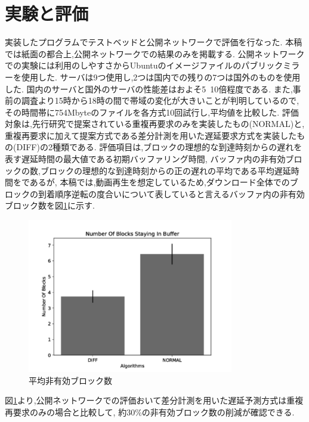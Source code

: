 \documentclass{ltjsarticle}
\begin{document}
\section{実験と評価}
\vspace{-2mm}
実装したプログラムでテストベッドと公開ネットワークで評価を行なった.
本稿では紙面の都合上,公開ネットワークでの結果のみを掲載する.
公開ネットワークでの実験には利用のしやすさからUbuntuのイメージファイルのパブリックミラーを使用した.
サーバは9つ使用し,2つは国内での残りの7つは国外のものを使用した.
国内のサーバと国外のサーバの性能差はおよそ5~10倍程度である.
また,事前の調査より15時から18時の間で帯域の変化が大きいことが判明しているので,
その時間帯に754Mbyteのファイルを各方式10回試行し,平均値を比較した.
評価対象は,先行研究で提案されている重複再要求のみを実装したもの(NORMAL)と,重複再要求に加えて提案方式である差分計測を用いた遅延要求方式を実装したもの(DIFF)の2種類である.
評価項目は,ブロックの理想的な到達時刻からの遅れを表す遅延時間の最大値である初期バッファリング時間,
バッファ内の非有効ブロックの数,ブロックの理想的な到達時刻からの正の遅れの平均である平均遅延時間をであるが,
本稿では,動画再生を想定しているため,ダウンロード全体でのブロックの到着順序逆転の度合いについて表していると言えるバッファ内の非有効ブロック数を図\ref{nsbpub}に示す.
\vspace{-4mm}
\begin{figure}[h]
	\centering
	\includegraphics[width=9cm]{figure/nsb-g.pdf}
	\vspace{-10mm}
	\caption{平均非有効ブロック数}
	\label{nsbpub}
\end{figure}
\vspace{-2mm}

図\ref{nsbpub}より,公開ネットワークでの評価おいて差分計測を用いた遅延予測方式は重複再要求のみの場合と比較して,
約30\%の非有効ブロック数の削減が確認できる.
\vspace{-8mm}
\end{document}
